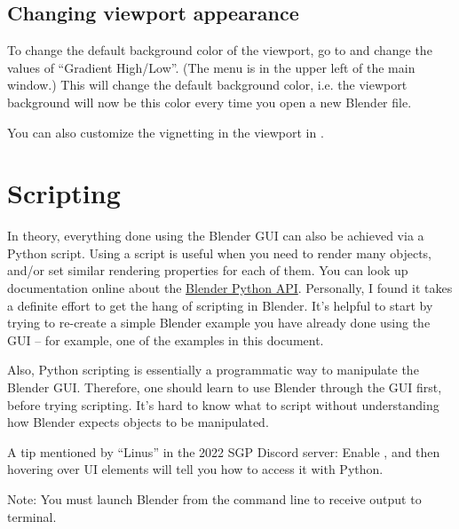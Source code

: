 \documentclass[10pt]{article}
\newcommand{\Menu}[2][]{\begingroup%
\tikzset{menu hack/.cd,#1}%
\menu{#2}%
\endgroup}
\begin{document}
\subsection{Changing viewport appearance}

To change the default background color of the viewport, go to  and change the values of ``Gradient High/Low''. (The \Menu[t>]{Edit} menu is in the upper left of the main window.) This will change the default background color, i.e. the viewport background will now be this color every time you open a new Blender file. %

You can also customize the vignetting in the viewport in .

\section{Scripting}
In theory, everything done using the Blender GUI can also be achieved via a Python script. Using a script is useful when you need to render many objects, and/or set similar rendering properties for each of them. You can look up documentation online about the \href{https://docs.blender.org/api/current/index.html}{Blender Python API}. Personally, I found it takes a definite effort to get the hang of scripting in Blender. It's helpful to start by trying to re-create a simple Blender example you have already done using the GUI -- for example, one of the examples in this document.

Also, Python scripting is essentially a programmatic way to manipulate the Blender GUI. Therefore, one should learn to use Blender through the GUI first, before trying scripting. It's hard to know what to script without understanding how Blender expects objects to be manipulated.

A tip mentioned by ``Linus'' in the 2022 SGP Discord server: Enable , and then hovering over UI elements will tell you how to access it with Python.

Note: You must launch Blender from the command line to receive output to terminal.
\end{document}
